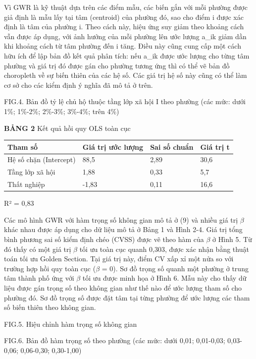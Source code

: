 Vì GWR là kỹ thuật dựa trên các điểm mẫu, các biến gắn với mỗi phường được giả định là mẫu lấy tại tâm (centroid) của phường đó, sao cho điểm i được xác định là tâm của phường i. Theo cách này, hiệu ứng suy giảm theo khoảng cách vẫn được áp dụng, với ảnh hưởng của mỗi phường lên ước lượng a\_ik giảm dần khi khoảng cách từ tâm phường đến i tăng. Điều này cũng cung cấp một cách hữu ích để lập bản đồ kết quả phân tích: nếu a\_ik được ước lượng cho từng tâm phường và giá trị đó được gán cho phường tương ứng thì có thể vẽ bản đồ choropleth về sự biến thiên của các hệ số. Các giá trị hệ số này cũng có thể làm cơ sở cho các kiểm định ý nghĩa đã mô tả ở trên.

FIG.4. Bản đồ tỷ lệ chủ hộ thuộc tầng lớp xã hội I theo phường (các mức: dưới 1\%; 1\%-2\%; 2\%-3\%; 3\%-4\%; trên 4\%)

\textbf{BẢNG 2} Kết quả hồi quy OLS toàn cục

{\small
\begin{longtable}[]{@{}llll@{}}
\toprule\noalign{}
Tham số & Giá trị ước lượng & Sai số chuẩn & Giá trị t \\
\midrule\noalign{}
\endhead
\bottomrule\noalign{}
\endlastfoot
Hệ số chặn (Intercept) & 88,5 & 2,89 & 30,6 \\
Tầng lớp xã hội & 1,88 & 0,33 & 5,7 \\
Thất nghiệp & -1,83 & 0,11 & 16,6 \\
\end{longtable}
}

R² = 0,83

Các mô hình GWR với hàm trọng số không gian mô tả ở (9) và nhiều giá trị \ensuremath{\beta} khác nhau được áp dụng cho dữ liệu mô tả ở Bảng 1 và Hình 2-4. Giá trị tổng bình phương sai số kiểm định chéo (CVSS) được vẽ theo hàm của \ensuremath{\beta} ở Hình 5. Từ đó thấy có một giá trị \ensuremath{\beta} tối ưu toàn cục quanh 0,303, được xác nhận bằng thuật toán tối ưu Golden Section. Tại giá trị này, điểm CV xấp xỉ một nửa so với trường hợp hồi quy toàn cục (\ensuremath{\beta} = 0). Sơ đồ trọng số quanh một phường ở trung tâm thành phố ứng với \ensuremath{\beta} tối ưu được minh họa ở Hình 6. Mẫu này cho thấy dữ liệu được gán trọng số theo không gian như thế nào để ước lượng tham số cho phường đó. Sơ đồ trọng số được đặt tâm tại từng phường để ước lượng các tham số biến thiên theo không gian.

FIG.5. Hiệu chỉnh hàm trọng số không gian

FIG.6. Bản đồ hàm trọng số theo phường (các mức: dưới 0,01; 0,01-0,03; 0,03-0,06; 0,06-0,30; 0,30-1,00)

